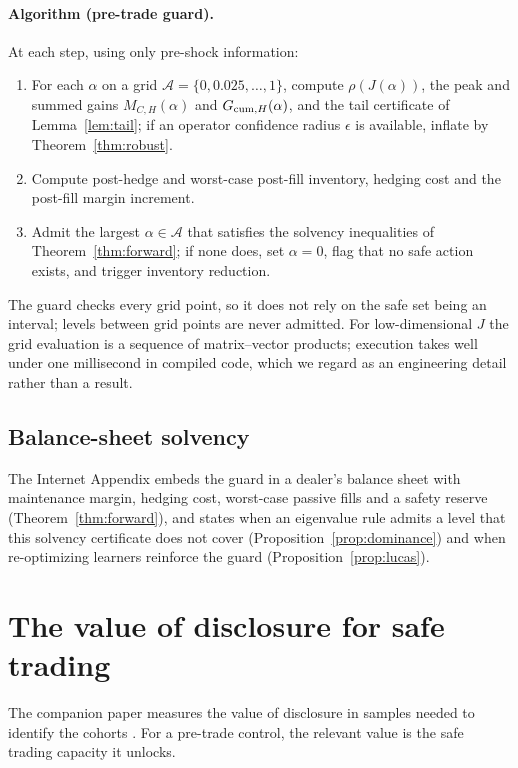 \documentclass[12pt]{article}
\theoremstyle{definition}
\theoremstyle{remark}
\begin{document}
\paragraph{Algorithm (pre-trade guard).} At each step, using only pre-shock information:
\begin{enumerate}[itemsep=1pt]
\item For each $\alpha$ on a grid $\mathcal A=\{0,0.025,\ldots,1\}$, compute $\rho(J(\alpha))$, the peak and summed gains $M_{C,H}(\alpha)$ and $G_{{\rm cum},H}(\alpha)$, and the tail certificate of Lemma~\ref{lem:tail}; if an operator confidence radius $\epsilon$ is available, inflate by Theorem~\ref{thm:robust}.
\item Compute post-hedge and worst-case post-fill inventory, hedging cost and the post-fill margin increment.
\item Admit the largest $\alpha\in\mathcal A$ that satisfies the solvency inequalities of Theorem~\ref{thm:forward}; if none does, set $\alpha=0$, flag that no safe action exists, and trigger inventory reduction.
\end{enumerate}
The guard checks every grid point, so it does not rely on the safe set being an interval; levels between grid points are never admitted. For low-dimensional $J$ the grid evaluation is a sequence of matrix--vector products; execution takes well under one millisecond in compiled code, which we regard as an engineering detail rather than a result.

\subsection{Balance-sheet solvency}
The Internet Appendix embeds the guard in a dealer's balance sheet with maintenance margin, hedging cost, worst-case passive fills and a safety reserve (Theorem~\ref{thm:forward}), and states when an eigenvalue rule admits a level that this solvency certificate does not cover (Proposition~\ref{prop:dominance}) and when re-optimizing learners reinforce the guard (Proposition~\ref{prop:lucas}).

\section{The value of disclosure for safe trading}\label{sec:disclosure}

The companion paper measures the value of disclosure in samples needed to identify the cohorts \citep{niroula2026}. For a pre-trade control, the relevant value is the safe trading capacity it unlocks.
\end{document}
